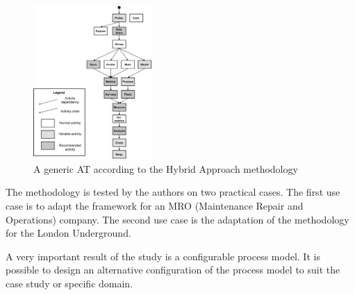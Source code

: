 \begin{figure}[htb]
    \centering
    \includegraphics[width=0.4\textwidth]{figures/hybrid-generic-at.jpg}
    \caption{A generic AT according to the Hybrid Approach methodology~\cite{woodal2013}}
    \label{fig:hybrid-generic-at}
\end{figure}
\FloatBarrier

The methodology is tested by the authors on two practical cases.
The first use case is to adapt the framework for an MRO (Maintenance Repair and Operations) company.
The second use case is the adaptation of the methodology for the London Underground.

A very important result of the study is a configurable process model.
It is possible to design an alternative configuration of the process model to suit the case study or specific domain.

